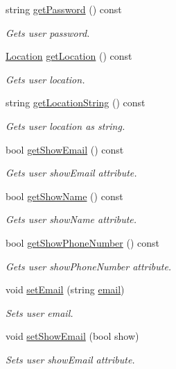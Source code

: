 \begin{DoxyCompactItemize}
string \hyperlink{class_user_a3f39e6b48da6b769692bf71f26104a6a}{get\+Password} () const 
\begin{DoxyCompactList}\small\item\em Gets user password. \end{DoxyCompactList}\item 
\hyperlink{class_location}{Location} \hyperlink{class_user_a7c2072cbf540ae1bd47992b40783843c}{get\+Location} () const 
\begin{DoxyCompactList}\small\item\em Gets user location. \end{DoxyCompactList}\item 
string \hyperlink{class_user_a7185d303044e8dbb683b717228e2560d}{get\+Location\+String} () const 
\begin{DoxyCompactList}\small\item\em Gets user location as string. \end{DoxyCompactList}\item 
bool \hyperlink{class_user_a6d936807efcd03cf1763742668ff8b7a}{get\+Show\+Email} () const 
\begin{DoxyCompactList}\small\item\em Gets user show\+Email attribute. \end{DoxyCompactList}\item 
bool \hyperlink{class_user_a232cf36107c8b0f7ff9440fc97cb402f}{get\+Show\+Name} () const 
\begin{DoxyCompactList}\small\item\em Gets user show\+Name attribute. \end{DoxyCompactList}\item 
bool \hyperlink{class_user_a55730e5ee153d90c64b1871d06055c26}{get\+Show\+Phone\+Number} () const 
\begin{DoxyCompactList}\small\item\em Gets user show\+Phone\+Number attribute. \end{DoxyCompactList}\item 
void \hyperlink{class_user_a9d38dd7a9f5ca79cf17ecf572d42c647}{set\+Email} (string \hyperlink{class_user_a2d678acd22b533660b4b7d8404961f14}{email})
\begin{DoxyCompactList}\small\item\em Sets user email. \end{DoxyCompactList}\item 
void \hyperlink{class_user_af2c1c491ccbb27dcf3426b8ab89841d5}{set\+Show\+Email} (bool show)
\begin{DoxyCompactList}\small\item\em Sets user show\+Email attribute. \end{DoxyCompactList}\item 

\end{DoxyCompactItemize}
